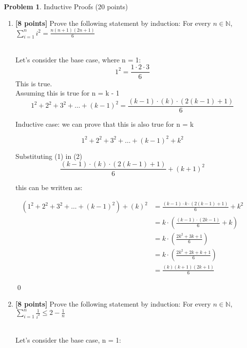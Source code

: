 \documentclass[11pt]{article}
\newcommand{\N}{\mathbb{N}}
\theoremstyle{definition}
\theoremstyle{theorem}
\newtheorem{prob}{Problem}
\newcommand{\solution}{\medskip\noindent{\color{DarkBlue}\textbf{Solution:}}}
\begin{document}
\begin{prob} Inductive Proofs (20 points) \end{prob}
\begin{enumerate}[label=(\alph*)]
\item \textbf{[8 points]} Prove the following statement by induction: For every $n \in \N$, $\sum_{i=1}^{n} i^2 = \frac{n(n+1)(2n+1)}{6}$

\solution
\\Let's consider the base case, where n = 1:
\begin{equation*}
	1^2 = \frac{1 \cdot 2 \cdot 3} {6}
\end{equation*}
This is true.
\\Assuming this is true for n = k - 1 
\begin{equation*}
	1^2 + 2^2 + 3^2 + \ldots + (k - 1)^2 = \frac{(k-1) \cdot (k) \cdot (2(k - 1)+1)} {6}  \tag{1}
\end{equation*}

Inductive case:
we can prove that this is also true for n = k

\begin{equation*}
	1^2 + 2^2 + 3^2 + \ldots + (k - 1)^2 + k^2 
\end{equation*}

Substituting (1) in (2)
\begin{equation*}
	\frac{(k-1) \cdot (k) \cdot (2(k - 1)+1)} {6}+ (k+1)^2 
\end{equation*}

this can be written as:

\begin{align*}
	(1^2 + 2^2 + 3^2 + \ldots + (k-1)^2 ) + (k)^2 &=\frac{(k-1) \cdot k \cdot (2(k - 1)+1)} {6} + k^2 \\
									&=k\cdot (\frac{(k-1)\cdot(2k-1)}{6} + k)\\
									&=k\cdot (\frac{2k^2 +3k + 1}{6})\\
									&=k\cdot (\frac{2k^2 +2k + k + 1}{6})\\
									&= \frac{(k)(k+1)(2k+1)}{6}
\end{align*}

\qed

\item \textbf{[8 points]} Prove the following statement by induction: For every $n \in \N$, $\sum_{i=1}^{n} \frac{1}{i^2} \leq 2 - \frac{1}{n}$

\solution
\\Let's consider the base case, n = 1:



\end{enumerate}
\end{document}
